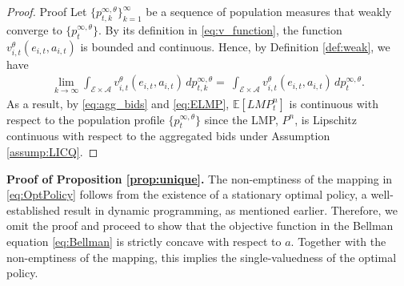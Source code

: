 \documentclass{article}
\theoremstyle{definition}
\theoremstyle{plain}
\begin{document}
\begin{proof}{Proof}
Let \(\{p^{\infty,\theta}_{t,k}\}_{k=1}^{\infty}\) be a sequence of population measures that weakly converge to \(\{p^{\infty,\theta}_{t}\}\). By its definition in \eqref{eq:v_function}, the function \(v_{i,t}^{\theta}(e_{i,t}, a_{i,t})\) is bounded and continuous. Hence, by Definition \ref{def:weak}, we have
\begin{align*}
\lim_{k\to \infty} \int_{\mathcal{E}\times\mathcal{A}} v^{\theta}_{i,t}(e_{i,t}, a_{i,t}) \, dp^{\infty, \theta}_{t, k}  = \ \int_{\mathcal{E}\times\mathcal{A}} v^{\theta}_{i,t}(e_{i,t}, a_{i,t}) \, dp_t^{\infty, \theta}.
\end{align*}
As a result, by \eqref{eq:agg_bids} and \eqref{eq:ELMP}, \(\mathbb{E}[LMP^n_t]\) is continuous with respect to the population profile \(\{p^{\infty,\theta}_{t}\}\) since the LMP, \(P^n\), is Lipschitz continuous with respect to the aggregated bids under Assumption \ref{assump:LICQ}. %
\end{proof}


\noindent \textbf{Proof of Proposition \ref{prop:unique}.}
	The non-emptiness of the mapping in \eqref{eq:OptPolicy} follows from the existence of a stationary optimal policy, a well-established result in dynamic programming, as mentioned earlier. Therefore, we omit the proof and proceed to show that the objective function in the Bellman equation \eqref{eq:Bellman} is strictly concave with respect to $a$. Together with the non-emptiness of the mapping, this implies the single-valuedness of the optimal policy.
	
\end{document}
